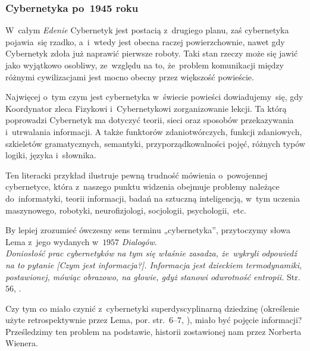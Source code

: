 \documentclass[10pt,t]{beamer}
\begin{document}
\begin{frame}
  \frametitle{Cybernetyka po~1945 roku}


  W~całym \textit{Edenie} Cybernetyk jest postacią z~drugiego planu, zaś
  cybernetyka pojawia~się rzadko, a~i~wtedy jest obecna raczej
  powierzchownie, nawet gdy Cybernetyk zdoła już naprawić pierwsze roboty.
  Taki stan rzeczy może się jawić jako wyjątkowo osobliwy, ze~względu
  na to, że~problem komunikacji między różnymi cywilizacjami jest mocno
  obecny przez większość powieście.

  Najwięcej o~tym czym jest cybernetyka w~świecie powieści dowiadujemy~się,
  gdy Koordynator zleca Fizykowi i~Cybernetykowi zorganizowanie lekcji. Ta
  którą poprowadzi Cybernetyk ma dotyczyć teorii, sieci oraz sposobów
  przekazywania i~utrwalania informacji. A także funktorów zdaniotwórczych,
  funkcji zdaniowych, szkieletów gramatycznych, semantyki,
  przyporządkowalności pojęć, różnych typów logiki, języka i~słownika.

  Ten literacki przykład ilustruje pewną trudność mówienia o~powojennej
  cybernetyce, która z~naszego punktu widzenia obejmuje problemy należące
  do~informatyki, teorii informacji, badań na sztuczną inteligencją, w~tym
  uczenia maszynowego, robotyki, neurofizjologi, socjologii,
  psychologii,~etc.

  By lepiej zrozumieć ówczesny sens terminu „cybernetyka”, przytoczymy
  słowa Lema z~jego wydanych w~$1957$ \textit{Dialogów}. \\
  \textit{Doniosłość prac cybernetyków na tym się właśnie zasadza,
    że~wykryli odpowiedź na to pytanie [Czym jest informacja?]. Informacja
    jest dzieckiem termodynamiki, postawionej, mówiąc obrazowo, na głowie,
    gdyż stanowi odwrotność entropii.}
  Str.~$56$, \parencite{Lem-Dialogi-Vol-I-Pub-1996}.

  Czy tym co miało czynić z~cybernetyki superdyscyplinarną dziedzinę
  (określenie użyte retrospektywnie przez Lema, por. str.~$6\text{--}7$,
  \parencite{Lem-Dialogi-Vol-I-Pub-1996}), miało być pojęcie informacji?
  Prześledzimy ten problem na podstawie, historii zostawionej nam przez
  Norberta Wienera.

\end{frame}
\end{document}
